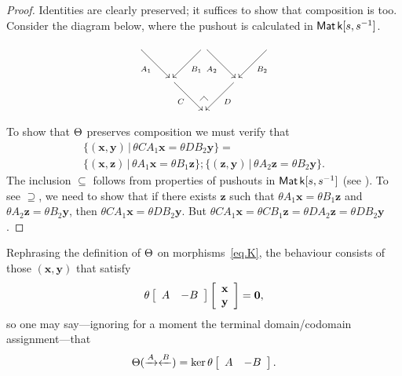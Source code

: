 \begin{proof}
Identities are clearly preserved; it suffices to show that composition is too.
Consider the diagram below, where the pushout is calculated in $\operatorname{\mathsf{Mat}}{\mathsf{k}[s,s^{-1}]}$.
\[
\xymatrix{
  {}\ar[dr]_{A_1} & & \ar[dl]^{B_1}  
  \ar[dr]_{A_2} & & \ar[dl]^{B_2} {} 
 \\
& \ar[dr]_{C} & & \ar[dl]^{D}  \\
& & {\save*!<0cm,-.5cm>[dl]@^{|-}\restore}
}
\]
To show that $\Theta$ preserves composition we must verify that 
\begin{multline*}
\{(\mathbf{x},\mathbf{y})\,|\, \theta CA_1\mathbf{x} = \theta DB_2\mathbf{y}\}
= \\
\{(\mathbf{x},\mathbf{z})\,|\, \theta A_1\mathbf{x} = \theta B_1\mathbf{z}\} ; 
\{(\mathbf{z},\mathbf{y})\,|\, \theta A_2\mathbf{z} = \theta B_2\mathbf{y}\}.
\end{multline*}
The inclusion $\subseteq$ follows from properties of pushouts in $\operatorname{\mathsf{Mat}}{\mathsf{k}[s,s^{-1}]}$ (see
\cite[Prop. 5.7]{BSZ2}).  To see $\supseteq$, we need to show that if there
exists $\mathbf{z}$ such that $\theta A_1\mathbf{x} = \theta B_1\mathbf{z}$ and
$\theta A_2\mathbf{z} = \theta B_2\mathbf{y}$, then $\theta CA_1\mathbf{x} =
\theta DB_2\mathbf{y}$.  But $\theta CA_1\mathbf{x}=\theta CB_1\mathbf{z}=\theta
DA_2\mathbf{z}=\theta DB_2\mathbf{y}$.
\end{proof}




Rephrasing the definition of $\Theta$ on morphisms~\eqref{eq.K}, the
behaviour consists of those $(\mathbf{x},\mathbf{y})$ that satisfy
\[
  \theta\left[\begin{array}{cc} A & -B\end{array}\right]
  \left[\begin{array}{c}\mathbf{x}\\\mathbf{y}\end{array}\right] 
  = \mathbf{0},
\]
so one may say---ignoring for a moment the terminal domain/codomain assignment---that 
\[ 
  \Theta (\xrightarrow{A}\xleftarrow{B}) = \ker \theta\left[
  \begin{array}{cc} A & -B\end{array}\right].
\]

